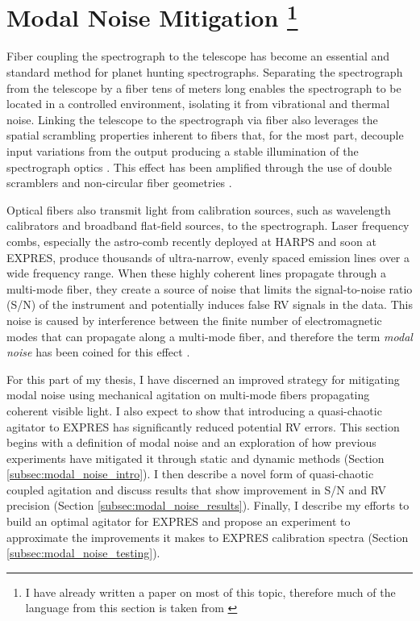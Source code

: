 \documentclass[11pt]{article}
\begin{document}
\section{Modal Noise Mitigation \footnote{I have already written a paper on most of this topic, therefore much of the language from this section is taken from \citet{Petersburg2018}}}
\label{sec:modal_noise}

Fiber coupling the spectrograph to the telescope has become an essential and standard method for planet hunting spectrographs. Separating the spectrograph from the telescope by a fiber tens of meters long enables the spectrograph to be located in a controlled environment, isolating it from vibrational and thermal noise. Linking the telescope to the spectrograph via fiber also leverages the spatial scrambling properties inherent to fibers that, for the most part, decouple input variations from the output producing a stable illumination of the spectrograph optics \citep{Hunter1992}. This effect has been amplified through the use of double scramblers \citep{Halverson2015a, Spronck2015} and non-circular fiber geometries \citep{Chazelas2010, Spronck2012, Plavchan2013}.

Optical fibers also transmit light from calibration sources, such as wavelength calibrators and broadband flat-field sources, to the spectrograph. Laser frequency combs, especially the  astro-comb \citep{Probst2014} recently deployed at HARPS and soon at EXPRES, produce thousands of ultra-narrow, evenly spaced emission lines over a wide frequency range. When these highly coherent lines propagate through a multi-mode fiber, they create a source of noise that limits the signal-to-noise ratio (S/N) of the instrument and potentially induces false RV signals in the data. This noise is caused by interference between the finite number of electromagnetic modes that can propagate along a multi-mode fiber, and therefore the term \textit{modal noise} has been coined for this effect \citep{Epworth1978}.

For this part of my thesis, I have discerned an improved strategy for mitigating modal noise using mechanical agitation on multi-mode fibers propagating coherent visible light. I also expect to show that introducing a quasi-chaotic agitator to EXPRES has significantly reduced potential RV errors. This section begins with a definition of modal noise and an exploration of how previous experiments have mitigated it through static and dynamic methods (Section \ref{subsec:modal_noise_intro}). I then describe a novel form of quasi-chaotic coupled agitation and discuss results that show improvement in S/N and RV precision (Section \ref{subsec:modal_noise_results}). Finally, I describe my efforts to build an optimal agitator for EXPRES and propose an experiment to approximate the improvements it makes to EXPRES calibration spectra (Section \ref{subsec:modal_noise_testing}).
\end{document}
